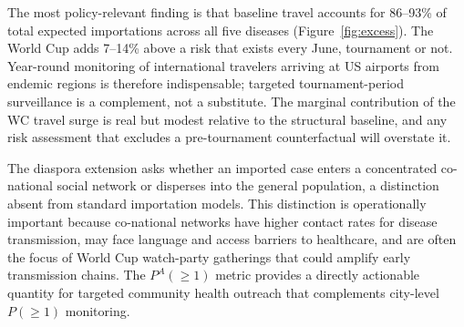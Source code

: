 \documentclass[12pt, a4paper]{article}
\begin{document}
The most policy-relevant finding is that baseline travel accounts for 86--93\% of total expected importations across all five diseases (Figure~\ref{fig:excess}). The World Cup adds 7--14\% above a risk that exists every June, tournament or not. Year-round monitoring of international travelers arriving at US airports from endemic regions is therefore indispensable; targeted tournament-period surveillance is a complement, not a substitute. The marginal contribution of the WC travel surge is real but modest relative to the structural baseline, and any risk assessment that  excludes a pre-tournament counterfactual will overstate it.

The diaspora extension asks whether an imported case enters a concentrated co-national social network or disperses into the general population, a distinction absent from standard importation models. This distinction is operationally important because co-national networks have higher contact rates for disease transmission, may face language and access barriers to healthcare, and are often the focus of World Cup watch-party gatherings that could amplify early transmission chains. The $P^A(\geq 1)$ metric provides a directly actionable quantity for targeted community health outreach that complements city-level $P(\geq 1)$ monitoring.
\end{document}
